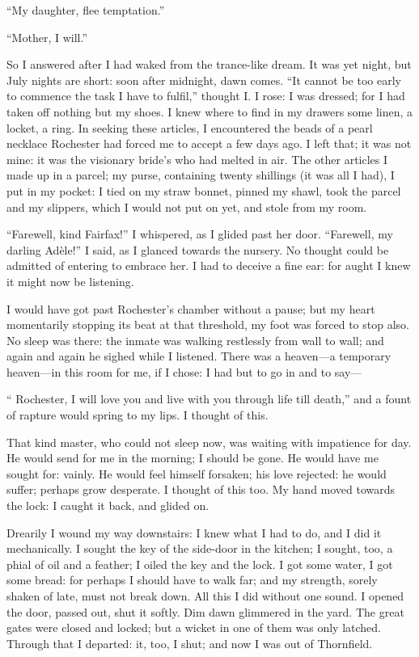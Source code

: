 \enquote{My daughter, flee temptation.}

\enquote{Mother, I will.}

So I answered after I had waked from the trance-like dream. It was yet
night, but July nights are short: soon after midnight, dawn comes.
\enquote{It cannot be too early to commence the task I have to fulfil,}
thought I\@. I rose: I was dressed; for I had taken off nothing but my
shoes. I knew where to find in my drawers some linen, a locket, a
ring. In seeking these articles, I encountered the beads of a pearl
necklace \Mr{} Rochester had forced me to accept a few days ago. I left
that; it was not mine: it was the visionary bride's who had melted in
air. The other articles I made up in a parcel; my purse, containing
twenty shillings (it was all I had), I put in my pocket: I tied on my
straw bonnet, pinned my shawl, took the parcel and my slippers, which I
would not put on yet, and stole from my room.

\enquote{Farewell, kind \Mrs{} Fairfax!} I whispered, as I glided past her
door. \enquote{Farewell, my darling Adèle!} I said, as I glanced
towards the nursery. No thought could be admitted of entering to
embrace her. I had to deceive a fine ear: for aught I knew it might now
be listening.

I would have got past \Mr{} Rochester's chamber without a pause; but my
heart momentarily stopping its beat at that threshold, my foot was
forced to stop also. No sleep was there: the inmate was walking
restlessly from wall to wall; and again and again he sighed while I
listened. There was a heaven---a temporary heaven---in this room for
me, if I chose: I had but to go in and to say---

\enquote{\Mr{} Rochester, I will love you and live with you through life
	till death,} and a fount of rapture would spring to my lips. I thought
of this.

That kind master, who could not sleep now, was waiting with impatience
for day. He would send for me in the morning; I should be gone. He
would have me sought for: vainly. He would feel himself forsaken; his
love rejected: he would suffer; perhaps grow desperate. I thought of
this too. My hand moved towards the lock: I caught it back, and glided
on.

Drearily I wound my way downstairs: I knew what I had to do, and I did
it mechanically. I sought the key of the side-door in the kitchen; I
sought, too, a phial of oil and a feather; I oiled the key and the
lock. I got some water, I got some bread: for perhaps I should have to
walk far; and my strength, sorely shaken of late, must not break down.
All this I did without one sound. I opened the door, passed out, shut
it softly. Dim dawn glimmered in the yard. The great gates were closed
and locked; but a wicket in one of them was only latched. Through that
I departed: it, too, I shut; and now I was out of Thornfield.

